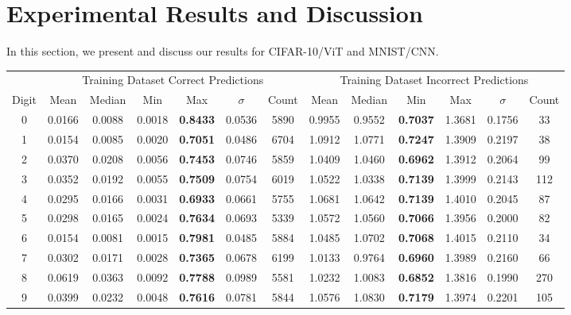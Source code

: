 
\section{Experimental Results and Discussion}

In this section, we present and discuss our results for CIFAR-10/ViT and MNIST/CNN. 

\begin{table}[ht]
\centering
\begin{tabular}{c|cccccc|cccccc}
\hline
& \multicolumn{6}{c|}{Training Dataset Correct Predictions} & \multicolumn{6}{c}{Training Dataset Incorrect Predictions} \\
Digit & Mean & Median & Min & Max & $\sigma$ & Count & Mean & Median & Min & Max & $\sigma$ & Count \\ \hline
0 & 0.0166 & 0.0088 & 0.0018 & \textbf{0.8433} & 0.0536 & 5890 & 0.9955 & 0.9552 & \textbf{0.7037} & 1.3681 & 0.1756 & 33 \\
1 & 0.0154 & 0.0085 & 0.0020 & \textbf{0.7051} & 0.0486 & 6704 & 1.0912 & 1.0771 & \textbf{0.7247} & 1.3909 & 0.2197 & 38 \\
2 & 0.0370 & 0.0208 & 0.0056 & \textbf{0.7453} & 0.0746 & 5859 & 1.0409 & 1.0460 & \textbf{0.6962} & 1.3912 & 0.2064 & 99 \\
3 & 0.0352 & 0.0192 & 0.0055 & \textbf{0.7509} & 0.0754 & 6019 & 1.0522 & 1.0338 & \textbf{0.7139} & 1.3999 & 0.2143 & 112 \\
4 & 0.0295 & 0.0166 & 0.0031 & \textbf{0.6933} & 0.0661 & 5755 & 1.0681 & 1.0642 & \textbf{0.7139} & 1.4010 & 0.2045 & 87 \\
5 & 0.0298 & 0.0165 & 0.0024 & \textbf{0.7634} & 0.0693 & 5339 & 1.0572 & 1.0560 & \textbf{0.7066} & 1.3956 & 0.2000 & 82 \\
6 & 0.0154 & 0.0081 & 0.0015 & \textbf{0.7981} & 0.0485 & 5884 & 1.0485 & 1.0702 & \textbf{0.7068} & 1.4015 & 0.2110 & 34 \\
7 & 0.0302 & 0.0171 & 0.0028 & \textbf{0.7365} & 0.0678 & 6199 & 1.0133 & 0.9764 & \textbf{0.6960} & 1.3989 & 0.2160 & 66 \\
8 & 0.0619 & 0.0363 & 0.0092 & \textbf{0.7788} & 0.0989 & 5581 & 1.0232 & 1.0083 & \textbf{0.6852} & 1.3816 & 0.1990 & 270 \\
9 & 0.0399 & 0.0232 & 0.0048 & \textbf{0.7616} & 0.0781 & 5844 & 1.0576 & 1.0830 & \textbf{0.7179} & 1.3974 & 0.2201 & 105 \\ \hline

\end{tabular}
\end{table}
